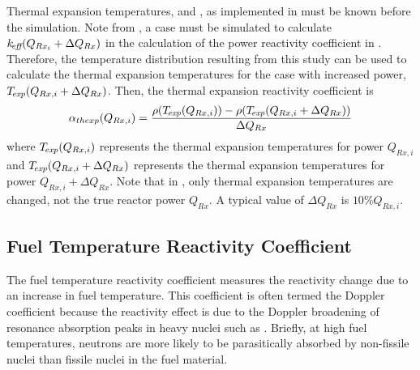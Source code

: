    Thermal expansion temperatures, \texpfuel and \texpstruct, as implemented in
     must be known before the simulation. Note from
    , a case must be simulated to
    calculate $k_{\!\mbox{\scriptsize \em eff}}(Q_{Rx_i} + \Delta Q_{Rx})$ in the calculation of the power
    reactivity coefficient in . Therefore, 
    the temperature distribution resulting from this study can be used to
    calculate the thermal expansion temperatures for the case with increased
    power, ${{T_{\!\mbox{\scriptsize \em exp}}}(Q_{Rx,i} + \Delta Q_{Rx})}$. Then, the thermal expansion
    reactivity coefficient is 
    \begin{equation}
      \label{eq:thermal_expansion_reactivity_coefficient}
      \alpha_{thexp}(Q_{Rx,i}) = \frac{\rho({T_{\!\mbox{\scriptsize \em exp}}}(Q_{Rx,i})) - 
        \rho({T_{\!\mbox{\scriptsize \em exp}}}(Q_{Rx,i} + \Delta Q_{Rx}))}
        {\Delta Q_{Rx}}
    \end{equation}
    where ${T_{\!\mbox{\scriptsize \em exp}}}(Q_{Rx,i})$ represents the thermal expansion temperatures for
    power $Q_{Rx,i}$ and ${T_{\!\mbox{\scriptsize \em exp}}}(Q_{Rx,i} + \Delta Q_{Rx})$ represents the
    thermal expansion temperatures for power $Q_{Rx,i} + \Delta Q_{Rx}$. Note
    that in , only thermal
    expansion temperatures are changed, not the true reactor power $Q_{Rx}$.
    A typical value of $\Delta Q_{Rx}$ is $10\% Q_{Rx,i}$.

  \subsection{Fuel Temperature Reactivity Coefficient}
  \label{sec:fuel_temperature_reactivity_coefficient}
    The fuel temperature reactivity coefficient measures the reactivity change 
    due to an increase in fuel temperature. This coefficient is often termed the
    Doppler coefficient because the reactivity effect is due to the Doppler
    broadening of resonance absorption peaks in heavy nuclei such as
     \cite{textbookknief}. Briefly, at high fuel temperatures, 
    neutrons are more likely to be parasitically absorbed by non-fissile nuclei
    than fissile nuclei in the fuel material.

